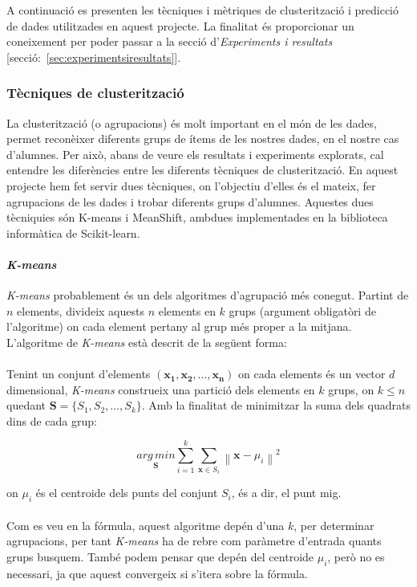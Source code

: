 \documentclass[12pt,a4paper,catalan]{article}
\begin{document}
A continuació es presenten les tècniques i mètriques de clusterització i predicció de dades utilitzades en aquest projecte. La finalitat és proporcionar un coneixement per poder passar a la secció d'\textit{Experiments i resultats} [secció:~\ref{sec:experimentsiresultats}].

\subsubsection{Tècniques de clusterització}
La clusterització (o agrupacions) és molt important en el món de les dades, permet reconèixer diferents grups de ítems de les nostres dades, en el nostre cas d'alumnes. Per això, abans de veure els resultats i experiments explorats, cal entendre les diferències entre les diferents tècniques de clusterització. En aquest projecte hem fet servir dues tècniques, on l'objectiu d'elles és el mateix, fer agrupacions de les dades i trobar diferents grups d'alumnes. Aquestes dues tècniquies són K-means i MeanShift, ambdues implementades en la biblioteca informàtica de Scikit-learn.

\paragraph{\textit{K-means}}
\textit{K-means} \cite{k-means} probablement és un dels algoritmes d'agrupació més conegut. Partint de $n$ elements, divideix aquests $n$ elements en $k$ grups (argument obligatòri de l'algoritme) on cada element pertany al grup més proper a la mitjana. L'algoritme de \textit{K-means} està descrit de la següent forma:
\\
\\
Tenint un conjunt d'elements $\mathbf{(x_1, x_2, \ldots, x_n)}$ on cada elements és un vector $d$ dimensional, \textit{K-means} construeix una partició dels elements en $k$ grups, on $k \leq n$ quedant $\mathbf{S} = \{S_1, S_2, \ldots, S_k\}$. Amb la finalitat de minimitzar la suma dels quadrats dins de cada grup:

$$ \underset{\mathbf{S}} {arg\,min} \sum_{i=1}^{k} \sum_{\mathbf{x} \in S_i} \left\| \mathbf{x} - \mu_i \right\|^2 $$

on $\mu_i$ és el centroide dels punts del conjunt $S_i$, és a dir, el punt mig.
\\
\\
Com es veu en la fórmula, aquest algoritme depén d'una $k$, per determinar agrupacions, per tant \textit{K-means} ha de rebre com paràmetre d'entrada quants grups busquem. També podem pensar que depén del centroide $\mu_i$, però no es necessari, ja que aquest convergeix si s'itera sobre la fórmula.
\end{document}

